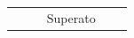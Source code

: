 \documentclass[a4paper,11pt]{article}
\begin{document}
\begin{longtable}{p{}p{}p{}p{}}
\begin{enumerate}
\end{enumerate} & Superato\\

\end{longtable}
\end{document}
